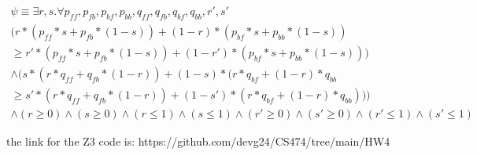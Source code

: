 \documentclass[12pt]{article}
\begin{document}
\begin {equation}
\begin{split}
    \psi \equiv \exists r,s . \forall p_{ff}, p_{fb}, p_{bf}, p_{bb}, q_{ff}, q_{fb}, q_{bf}, q_{bb}, r', s' \\ 
    (r*(p_{ff}*s + p_{fb}*(1-s)) + (1-r)*(p_{bf}*s + p_{bb}*(1-s)) \\ \geq r'*(p_{ff}*s + p_{fb}*(1-s)) + (1-r')*(p_{bf}*s + p_{bb}*(1-s))) \\ 
    \land (s*(r*q_{ff} + q_{fb} * (1-r)) + (1-s)*(r*q_{bf} + (1-r)*q_{bb} \\ \geq s'*(r*q_{ff} + q_{fb} * (1-r)) + (1-s')*(r*q_{bf} + (1-r)*q_{bb})))\\ \land (r \geq 0) \land (s \geq 0) \land (r \leq 1) \land (s \leq 1) \land (r' \geq 0) \land (s' \geq 0) \land (r' \leq 1) \land (s' \leq 1)
\end{split}
\end {equation}

the link for the Z3 code is: https://github.com/devg24/CS474/tree/main/HW4
\end{document}
